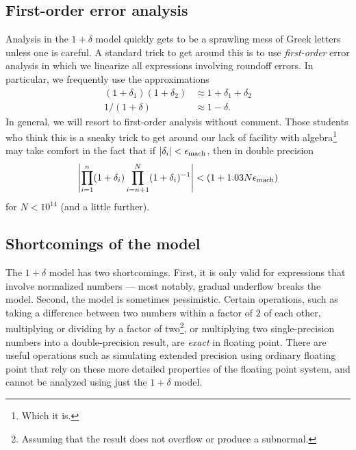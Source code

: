 \documentclass[12pt, leqno]{article} %
\begin{document}
\subsection{First-order error analysis}

Analysis in the $1+\delta$ model quickly gets to be a sprawling mess
of Greek letters unless one is careful.  A standard trick to get
around this is to use {\em first-order} error analysis in which we
linearize all expressions involving roundoff errors.  In particular,
we frequently use the approximations
\begin{align*}
  (1+\delta_1)(1+\delta_2) & \approx 1+\delta_1 + \delta_2 \\
  1/(1+\delta) & \approx 1-\delta.
\end{align*}
In general, we will resort to first-order analysis without comment.
Those students who think this is a sneaky trick to get around our
lack of facility with algebra\footnote{%
Which it is.
}
may take comfort in the fact that if $|\delta_i| < \epsilon_{\mathrm{mach}}$, then
in double precision
\[
  \left| \prod_{i=1}^n (1+\delta_i) \prod_{i=n+1}^N (1+\delta_i)^{-1} \right| < (1+1.03 N \epsilon_{\mathrm{mach}})
\]
for $N < 10^{14}$ (and a little further).

\subsection{Shortcomings of the model}

The $1+\delta$ model has two shortcomings.  First, it is only valid
for expressions that involve normalized numbers --- most notably,
gradual underflow breaks the model.  Second, the model is sometimes
pessimistic.  Certain operations, such as taking a difference between
two numbers within a factor of $2$ of each other, multiplying or
dividing by a factor of two\footnote{Assuming that the result
does not overflow or produce a subnormal.}, or multiplying two
single-precision numbers into a double-precision result,
are {\em exact} in floating point.  There are useful operations
such as simulating extended precision using ordinary floating point
that rely on these more detailed properties of the floating point system,
and cannot be analyzed using just the $1+\delta$ model.
\end{document}
